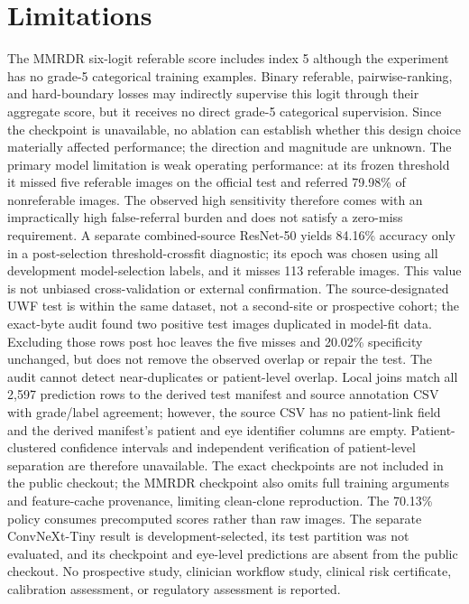 \documentclass{ieeeaccess}
\begin{document}
\section{Limitations}
The MMRDR six-logit referable score includes index 5 although the experiment has no grade-5 categorical training examples. Binary referable, pairwise-ranking, and hard-boundary losses may indirectly supervise this logit through their aggregate score, but it receives no direct grade-5 categorical supervision. Since the checkpoint is unavailable, no ablation can establish whether this design choice materially affected performance; the direction and magnitude are unknown.
The primary model limitation is weak operating performance: at its frozen threshold it missed five referable images on the official test and referred 79.98\% of nonreferable images. The observed high sensitivity therefore comes with an impractically high false-referral burden and does not satisfy a zero-miss requirement. A separate combined-source ResNet-50 yields 84.16\% accuracy only in a post-selection threshold-crossfit diagnostic; its epoch was chosen using all development model-selection labels, and it misses 113 referable images. This value is not unbiased cross-validation or external confirmation. The source-designated UWF test is within the same dataset, not a second-site or prospective cohort; the exact-byte audit found two positive test images duplicated in model-fit data. Excluding those rows post hoc leaves the five misses and 20.02\% specificity unchanged, but does not remove the observed overlap or repair the test. The audit cannot detect near-duplicates or patient-level overlap. Local joins match all 2,597 prediction rows to the derived test manifest and source annotation CSV with grade/label agreement; however, the source CSV has no patient-link field and the derived manifest's patient and eye identifier columns are empty. Patient-clustered confidence intervals and independent verification of patient-level separation are therefore unavailable. The exact checkpoints are not included in the public checkout; the MMRDR checkpoint also omits full training arguments and feature-cache provenance, limiting clean-clone reproduction. The 70.13\% policy consumes precomputed scores rather than raw images. The separate ConvNeXt-Tiny result is development-selected, its test partition was not evaluated, and its checkpoint and eye-level predictions are absent from the public checkout. No prospective study, clinician workflow study, clinical risk certificate, calibration assessment, or regulatory assessment is reported.
\end{document}
